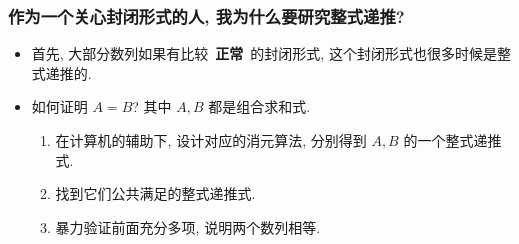 \documentclass{ctexbeamer}
\begin{document}
\begin{frame}
  \frametitle{作为一个关心封闭形式的人, 我为什么要研究整式递推?}

  \begin{itemize}
    \item 首先, 大部分数列如果有比较~\textbf{正常}~的封闭形式, 这个封闭形式也很多时候是整式递推的.
    \item 如何证明 $A=B$? 其中 $A, B$ 都是组合求和式.
    \begin{enumerate}
      \item 在计算机的辅助下, 设计对应的消元算法, 分别得到 $A, B$ 的一个整式递推式.
      \item 找到它们公共满足的整式递推式.
      \item 暴力验证前面充分多项, 说明两个数列相等.
    \end{enumerate}
  \end{itemize}

\end{frame}
\end{document}
